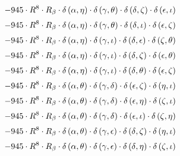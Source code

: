 \begin{subequations}
\begin{gather}
 \\[0.2em] \notag 		 - 945 \cdot R^{8} \cdot R_{\beta{}} \cdot \delta{}\left(\alpha{}, \eta{}\right) \cdot \delta{}\left(\gamma{}, \theta{}\right) \cdot \delta{}\left(\delta{}, \zeta{}\right) \cdot \delta{}\left(\epsilon{}, \iota{}\right) 
 \\[0.2em] \notag 		 - 945 \cdot R^{8} \cdot R_{\beta{}} \cdot \delta{}\left(\alpha{}, \eta{}\right) \cdot \delta{}\left(\gamma{}, \theta{}\right) \cdot \delta{}\left(\delta{}, \iota{}\right) \cdot \delta{}\left(\epsilon{}, \zeta{}\right) 
 \\[0.2em] \notag 		 - 945 \cdot R^{8} \cdot R_{\beta{}} \cdot \delta{}\left(\alpha{}, \eta{}\right) \cdot \delta{}\left(\gamma{}, \iota{}\right) \cdot \delta{}\left(\delta{}, \epsilon{}\right) \cdot \delta{}\left(\zeta{}, \theta{}\right) 
 \\[0.2em] \notag 		 - 945 \cdot R^{8} \cdot R_{\beta{}} \cdot \delta{}\left(\alpha{}, \eta{}\right) \cdot \delta{}\left(\gamma{}, \iota{}\right) \cdot \delta{}\left(\delta{}, \zeta{}\right) \cdot \delta{}\left(\epsilon{}, \theta{}\right) 
 \\[0.2em] \notag 		 - 945 \cdot R^{8} \cdot R_{\beta{}} \cdot \delta{}\left(\alpha{}, \eta{}\right) \cdot \delta{}\left(\gamma{}, \iota{}\right) \cdot \delta{}\left(\delta{}, \theta{}\right) \cdot \delta{}\left(\epsilon{}, \zeta{}\right) 
 \\[0.2em] \notag 		 - 945 \cdot R^{8} \cdot R_{\beta{}} \cdot \delta{}\left(\alpha{}, \theta{}\right) \cdot \delta{}\left(\gamma{}, \delta{}\right) \cdot \delta{}\left(\epsilon{}, \zeta{}\right) \cdot \delta{}\left(\eta{}, \iota{}\right) 
 \\[0.2em] \notag 		 - 945 \cdot R^{8} \cdot R_{\beta{}} \cdot \delta{}\left(\alpha{}, \theta{}\right) \cdot \delta{}\left(\gamma{}, \delta{}\right) \cdot \delta{}\left(\epsilon{}, \eta{}\right) \cdot \delta{}\left(\zeta{}, \iota{}\right) 
 \\[0.2em] \notag 		 - 945 \cdot R^{8} \cdot R_{\beta{}} \cdot \delta{}\left(\alpha{}, \theta{}\right) \cdot \delta{}\left(\gamma{}, \delta{}\right) \cdot \delta{}\left(\epsilon{}, \iota{}\right) \cdot \delta{}\left(\zeta{}, \eta{}\right) 
 \\[0.2em] \notag 		 - 945 \cdot R^{8} \cdot R_{\beta{}} \cdot \delta{}\left(\alpha{}, \theta{}\right) \cdot \delta{}\left(\gamma{}, \epsilon{}\right) \cdot \delta{}\left(\delta{}, \zeta{}\right) \cdot \delta{}\left(\eta{}, \iota{}\right) 
 \\[0.2em] \notag 		 - 945 \cdot R^{8} \cdot R_{\beta{}} \cdot \delta{}\left(\alpha{}, \theta{}\right) \cdot \delta{}\left(\gamma{}, \epsilon{}\right) \cdot \delta{}\left(\delta{}, \eta{}\right) \cdot \delta{}\left(\zeta{}, \iota{}\right) 

\end{gather}
\end{subequations}
